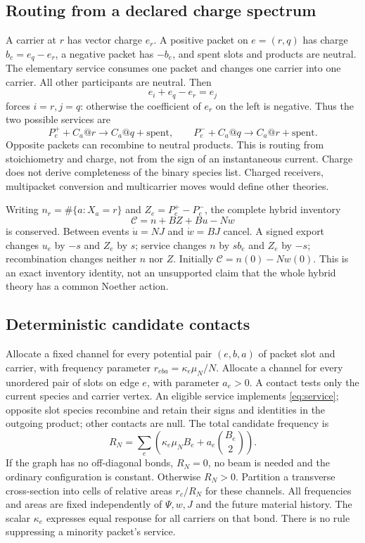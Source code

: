 \documentclass[11pt]{article}
\theoremstyle{definition}\newtheorem{definition}[theorem]{Definition}
\theoremstyle{remark}\newtheorem{remark}[theorem]{Remark}
\begin{document}
\subsection{Routing from a declared charge spectrum}
A carrier at $r$ has vector charge $e_r$. A positive packet on $e=(r,q)$ has charge $b_e=e_q-e_r$, a negative packet has $-b_e$, and spent slots and products are neutral. The elementary service consumes one packet and changes one carrier into one carrier. All other participants are neutral. Then
\[
 e_i+e_q-e_r=e_j
\]
forces $i=r,j=q$: otherwise the coefficient of $e_r$ on the left is negative. Thus the two possible services are
\begin{equation}
 P_e^++C_a@r\longrightarrow C_a@q+\mathrm{spent},\qquad
 P_e^-+C_a@q\longrightarrow C_a@r+\mathrm{spent}.
 \label{eq:service}
\end{equation}
Opposite packets can recombine to neutral products. This is routing from stoichiometry and charge, not from the sign of an instantaneous current. Charge does not derive completeness of the binary species list. Charged receivers, multipacket conversion and multicarrier moves would define other theories.

Writing $n_r=\#\{a:X_a=r\}$ and $Z_e=P_e^+-P_e^-$, the complete hybrid inventory
\begin{equation}
 \mathcal C=n+BZ+Bu-Nw
 \label{eq:charge}
\end{equation}
is conserved. Between events $\dot u=NJ$ and $\dot w=BJ$ cancel. A signed export changes $u_e$ by $-s$ and $Z_e$ by $s$; service changes $n$ by $sb_e$ and $Z_e$ by $-s$; recombination changes neither $n$ nor $Z$. Initially $\mathcal C=n(0)-Nw(0)$. This is an exact inventory identity, not an unsupported claim that the whole hybrid theory has a common Noether action.

\subsection{Deterministic candidate contacts}
Allocate a fixed channel for every potential pair $(e,b,a)$ of packet slot and carrier, with frequency parameter $r_{eba}=\kappa_e\mu_N/N$. Allocate a channel for every unordered pair of slots on edge $e$, with parameter $a_e>0$. A contact tests only the current species and carrier vertex. An eligible service implements \eqref{eq:service}; opposite slot species recombine and retain their signs and identities in the outgoing product; other contacts are null. The total candidate frequency is
\begin{equation}
 R_N=\sum_e\left(\kappa_e\mu_NB_e+a_e\binom{B_e}{2}\right).
 \label{eq:candidate}
\end{equation}
If the graph has no off-diagonal bonds, $R_N=0$, no beam is needed and the ordinary configuration is constant. Otherwise $R_N>0$. Partition a transverse cross-section into cells of relative areas $r_c/R_N$ for these channels. All frequencies and areas are fixed independently of $\Psi,w,J$ and the future material history. The scalar $\kappa_e$ expresses equal response for all carriers on that bond. There is no rule suppressing a minority packet's service.
\end{document}

